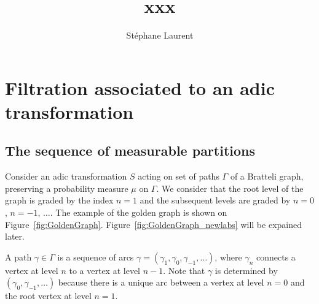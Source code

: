 \documentclass[12pt,a4paper]{article}
\author{Stéphane Laurent}
\title{xxx}
\begin{document}
\theoremstyle{defstyle}
\newtheorem{definition}{Definition}
\newtheorem{remark}{Remark}
\newtheorem{question}{Question}
\newtheorem{clarify}{To clarify}
\theoremstyle{thmstyle}
\newtheorem{thm}{Theorem}[section]
\newtheorem{ppsition}{Proposition}
\newtheorem{lemma}{Lemma}

\newcommand{\FF}{\mathcal{F}}
\newcommand{\GG}{\mathcal{G}}
\newcommand{\EE}{\mathbb{E}}
\newcommand{\II}{\mathcal{I}}
\newcommand{\LL}{\mathcal{L}}
\newcommand{\OO}{\mathcal{O}}
\newcommand{\XX}{\mathcal{X}}
\newcommand{\given}{\mid}
\newcommand{\eps}{\epsilon}
\newcommand{\indic}{\boldsymbol 1}
\newcommand{\Vb}{\boldsymbol V}

\newcommand{\indvee}{\dot{\vee}}
\newcommand{\indep}{\mathrel{\text{\scalebox{1.07}{$\perp\mkern-10mu\perp$}}}}

\maketitle

\section{Filtration associated to an adic transformation} 

\subsection{The sequence of measurable partitions}

Consider an adic transformation $S$ acting on set of paths $\Gamma$ of a 
Bratteli graph, preserving a probability measure $\mu$ on $\Gamma$. 
We consider that the root level of the graph is graded by the index 
$n=1$ and the subsequent levels are graded by $n=0$, $n=-1$, $\ldots$. 
The example of the golden graph is shown on Figure~\ref{fig:GoldenGraph}. 
Figure~\ref{fig:GoldenGraph_newlabs} will be expained later.

A path $\gamma \in \Gamma$ is a sequence of arcs 
$\gamma=(\gamma_{1}, \gamma_0, \gamma_{-1}, \ldots)$, where $\gamma_n$ connects 
a vertex at level $n$ to a vertex at level $n-1$. 
Note that $\gamma$ is determined by $(\gamma_0, \gamma_{-1}, \ldots)$ 
because there is a unique arc between a vertex at level $n=0$ and the root vertex 
at level $n=1$.  
\end{document}
